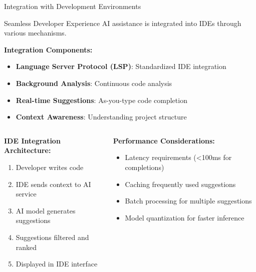 \documentclass{beamer}
\begin{document}
\begin{frame}[t]{Integration with Development Environments}
    \begin{block}{Seamless Developer Experience}
        AI assistance is integrated into IDEs through various mechanisms.
    \end{block}
    
    \textbf{Integration Components:}
    \begin{itemize}
        \item \textbf{Language Server Protocol (LSP)}: Standardized IDE integration
        \item \textbf{Background Analysis}: Continuous code analysis
        \item \textbf{Real-time Suggestions}: As-you-type code completion
        \item \textbf{Context Awareness}: Understanding project structure
    \end{itemize}
    
    \begin{columns}[t]
        \begin{column}{0.5\textwidth}
            \textbf{IDE Integration Architecture:}
            \begin{enumerate}
                \item Developer writes code
                \item IDE sends context to AI service
                \item AI model generates suggestions
                \item Suggestions filtered and ranked
                \item Displayed in IDE interface
            \end{enumerate}
        \end{column}
        \begin{column}{0.5\textwidth}
            \textbf{Performance Considerations:}
            \begin{itemize}
                \item Latency requirements (<100ms for completions)
                \item Caching frequently used suggestions
                \item Batch processing for multiple suggestions
                \item Model quantization for faster inference
            \end{itemize}
        \end{column}
    \end{columns}
\end{frame}
\end{document}
